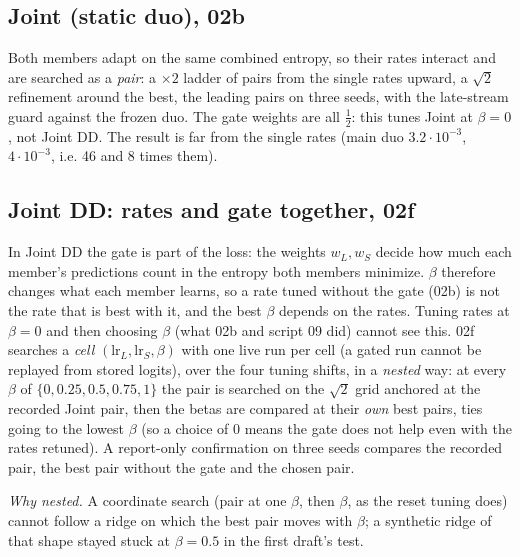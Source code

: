 \documentclass[10pt]{article}
\newcommand{\lr}[2]{\(#1{\cdot}10^{#2}\)}
\begin{document}
\subsection{Joint (static duo), 02b}
Both members adapt on the same combined entropy, so their rates interact and are searched as a \emph{pair}: a \(\times2\) ladder of pairs from the single rates upward, a \(\sqrt2\) refinement around the best, the leading pairs on three seeds, with the late-stream guard against the frozen duo. The gate weights are all \(\tfrac12\): this tunes Joint at \(\beta=0\), not Joint DD. The result is far from the single rates (main duo \lr{3.2}{-3}, \lr{4}{-3}, i.e. 46 and 8 times them).

\subsection{Joint DD: rates and gate together, 02f}\label{sec:jointdd}
In Joint DD the gate is part of the loss: the weights \(w_L, w_S\) decide how much each member's predictions count in the entropy both members minimize. \(\beta\) therefore changes what each member learns, so a rate tuned without the gate (02b) is not the rate that is best with it, and the best \(\beta\) depends on the rates. Tuning rates at \(\beta=0\) and then choosing \(\beta\) (what 02b and script 09 did) cannot see this. 02f searches a \emph{cell} \((\text{lr}_L, \text{lr}_S, \beta)\) with one live run per cell (a gated run cannot be replayed from stored logits), over the four tuning shifts, in a \emph{nested} way: at every \(\beta\) of \(\{0, 0.25, 0.5, 0.75, 1\}\) the pair is searched on the \(\sqrt2\) grid anchored at the recorded Joint pair, then the betas are compared at their \emph{own} best pairs, ties going to the lowest \(\beta\) (so a choice of 0 means the gate does not help even with the rates retuned). A report-only confirmation on three seeds compares the recorded pair, the best pair without the gate and the chosen pair.

\emph{Why nested.} A coordinate search (pair at one \(\beta\), then \(\beta\), as the reset tuning does) cannot follow a ridge on which the best pair moves with \(\beta\); a synthetic ridge of that shape stayed stuck at \(\beta=0.5\) in the first draft's test.
\end{document}
